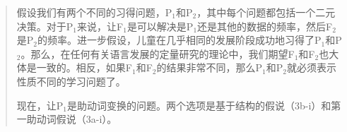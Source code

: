 \begin{quote}
   假设我们有两个不同的习得问题，P$_1$和P$_2$，其中每个问题都包括一个二元决策。对于P$_1$来说，让F$_1$是可以解决是P$_1$还是其他的数据的频率，然后F$_2$是P$_2$的频率。进一步假设，儿童在几乎相同的发展阶段成功地习得了P$_1$和P$_2$。那么，在任何有关语言发展的定量研究的理论中，我们期望F$_1$和F$_2$也大体是一致的。相反，如果F$_1$和F$_2$的结果非常不同，那么P$_1$和P$_2$就必须表示性质不同的学习问题了。 

   现在，让P$_1$是助动词变换的问题。两个选项是基于结构的假说（3b-i）和第一助动词假说（3a-i）。\citep[]{LY2002a}
\end{quote}


